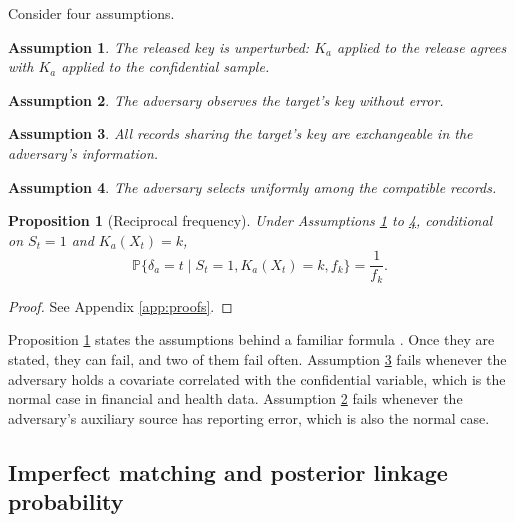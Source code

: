 \documentclass[11pt,a4paper]{article}
\theoremstyle{plain}
\newtheorem{proposition}{Proposition}
\theoremstyle{definition}
\theoremstyle{definition}
\theoremstyle{plain}
\newtheorem{assumption}{Assumption}
\newcommand{\Prob}{\mathbb{P}}
\begin{document}
Consider four assumptions.

\begin{assumption}\label{as:key}
The released key is unperturbed: $K_a$ applied to the release agrees with $K_a$
applied to the confidential sample.
\end{assumption}
\begin{assumption}\label{as:obs}
The adversary observes the target's key without error.
\end{assumption}
\begin{assumption}\label{as:exch}
All records sharing the target's key are exchangeable in the adversary's
information.
\end{assumption}
\begin{assumption}\label{as:unif}
The adversary selects uniformly among the compatible records.
\end{assumption}

\begin{proposition}[Reciprocal frequency]\label{prop:recip}
Under Assumptions \ref{as:key} to \ref{as:unif}, conditional on $S_t = 1$ and
$K_a(X_t) = k$,
\begin{equation}
\Prob\{\delta_a = t \mid S_t = 1, K_a(X_t) = k, f_k\} = \frac{1}{f_k} .
\label{eq:recip}
\end{equation}
\end{proposition}

\begin{proof}
See Appendix \ref{app:proofs}.
\end{proof}

Proposition \ref{prop:recip} states the assumptions behind a familiar formula
\citep{duncan1989,skinner2002}. Once they are stated, they can fail,
and two of them fail often. Assumption \ref{as:exch} fails whenever the
adversary holds a covariate correlated with the confidential variable, which is
the normal case in financial and health data. Assumption \ref{as:obs} fails
whenever the adversary's auxiliary source has reporting error, which is also the
normal case.

\subsection{Imperfect matching and posterior linkage probability}
\end{document}
